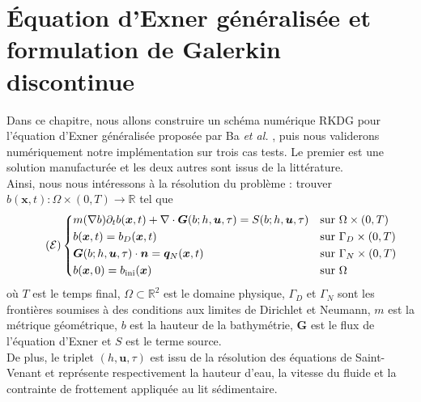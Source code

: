 \documentclass[11pt, a4paper, oneside]{report}
\begin{document}
\chapter{Équation d'Exner généralisée et formulation de Galerkin discontinue}

Dans ce chapitre, nous allons construire un schéma numérique RKDG pour l'équation d'Exner généralisée proposée par Ba \textit{et al.} \cite{ba2026coupled}, puis nous validerons numériquement notre implémentation sur trois cas tests. Le premier est une solution manufacturée et les deux autres sont issus de la littérature. \\
Ainsi, nous nous intéressons à la résolution du problème : trouver $b(\bm{x}, t) : \Omega \times (0, T) \longrightarrow \mathbb{R}$ tel que
\begin{equation} \tag{$\mathcal{E}$} \label{eq:Exner_generalisee}
    \left \{
    \begin{aligned}
        &m(\nabla b) \partial_t b(\bm{x}, t) + \nabla \cdot \bm{G}(b; h, \bm{u}, \tau) = S(b; h, \bm{u}, \tau)  &&\text{sur } \Omega \times (0, T) \\
        &b(\bm{x}, t) = b_D(\bm{x}, t)    &&\text{sur } \Gamma_D \times (0, T) \\
        &\bm{G}(b; h, \bm{u}, \tau) \cdot \bm{n} = \bm{q}_N(\bm{x}, t)  &&\text{sur } \Gamma_N \times (0, T) \\
        &b(\bm{x}, 0) = b_\text{ini}(\bm{x})  &&\text{sur } \Omega
    \end{aligned}
    \right .
\end{equation}
où $T$ est le temps final, $\Omega \subset \mathbb{R}^2$ est le domaine physique, $\Gamma_D$ et $\Gamma_N$ sont les frontières soumises à des conditions aux limites de Dirichlet et Neumann, $m$ est la métrique géométrique, $b$ est la hauteur de la bathymétrie, $\bm{G}$ est le flux de l'équation d'Exner et $S$ est le terme source. \\
De plus, le triplet $(h, \bm{u}, \tau)$ est issu de la résolution des équations de Saint-Venant et représente respectivement la hauteur d'eau, la vitesse du fluide et la contrainte de frottement appliquée au lit sédimentaire. \\
\end{document}
